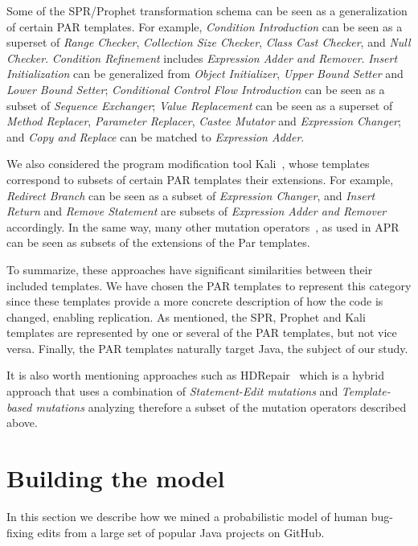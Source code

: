 \documentclass[conference]{IEEEtran}
\begin{document}
Some of the SPR/Prophet transformation schema can be seen as a generalization of certain PAR 
templates. For example, \emph{Condition Introduction} can be seen as a superset of 
\emph{Range Checker}, \emph{Collection Size 
Checker}, \emph{Class Cast Checker}, and \emph{Null Checker}. \emph{Condition Refinement} includes \emph{Expression Adder and Remover}. \emph{Insert Initialization} can be 
generalized from \emph{Object Initializer}, \emph{Upper Bound Setter} and \emph{Lower Bound Setter}; \emph{Conditional Control Flow Introduction} can be 
seen as a subset of \emph{Sequence Exchanger};
\emph{Value Replacement} can be seen as a superset of \emph{Method 
Replacer}, \emph{Parameter Replacer}, \emph{Castee Mutator} and \emph{Expression Changer}; and \emph{Copy 
and Replace} can be matched to \emph{Expression Adder}. 

We also considered the program modification tool Kali~\cite{Qi15}, whose
templates correspond to subsets of certain PAR templates their extensions. 
For example, \emph{Redirect Branch} can be seen as
a subset of \emph{Expression Changer}, and \emph{Insert Return} and \emph{Remove Statement} are
subsets of \emph{Expression Adder and Remover} accordingly. In the same way,
many other mutation operators~\cite{Offutt96,Offutt06}, as used in
APR~\cite{debroy10,xuan16} can be seen as subsets of the extensions of the 
Par templates.

To summarize, these approaches have significant similarities between their
included templates.  We have chosen the PAR templates to represent this category 
since these templates provide a more concrete description of how the code is 
changed, enabling replication. As mentioned, 
the SPR, Prophet and Kali templates are represented by one or several of the PAR
templates, but not vice versa.  Finally, the PAR templates naturally target
Java, the subject of our study. 

It is also worth mentioning approaches such as HDRepair~\cite{xuan16} which is a hybrid approach that uses a combination of \emph{Statement-Edit mutations} and \emph{Template-based mutations} analyzing therefore a subset of the mutation operators described above.

\section{Building the model} \label{buildingTheModel}

In this section we describe how we mined a probabilistic
model of human bug-fixing edits from a large set of popular Java projects on GitHub. 
\end{document}
